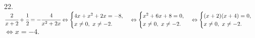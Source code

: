 22. $\cfrac{2}{x+2}+\cfrac{1}{2}=-\cfrac{4}{x^2+2x}\Leftrightarrow\begin{cases} 4x+x^2+2x=-8,\\ x\neq0,\ x\neq-2.\end{cases}\Leftrightarrow
\begin{cases} x^2+6x+8=0,\\ x\neq0,\ x\neq-2.\end{cases}\Leftrightarrow\begin{cases} (x+2)(x+4)=0,\\ x\neq0,\ x\neq-2.\end{cases}$\\$\Leftrightarrow x=-4.$\\
